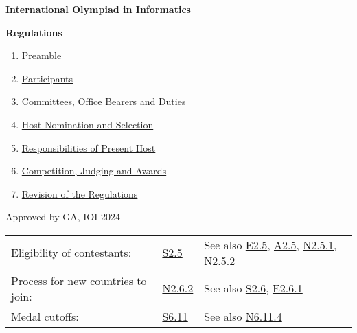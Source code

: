 \documentclass[12pt,a4paper]{article}
\begin{document}
\newcommand{\Statute}[2]{\item[\textbf{S#1}]\label{S#1} #2}
\newcommand{\Explication}[2]{\item[\textbf{E#1}]\label{E#1} #2}
\newcommand{\Appendix}[2]{\item[\textbf{A#1}]\label{A#1} #2}
\newcommand{\Note}[2]{\item[\textbf{N#1}]\label{N#1} \emph{#2}}
\newcommand{\Separator}[1]{\item[]\noindent\rule[4pt]{\linewidth}{0.4pt}}
\newcommand{\IOIn}[1][]{IOI\emph{'$n{#1}$}}
\newcommand{\Link}[1]{\hyperref[#1]{#1}}

\centerline{\huge \textbf{International Olympiad in Informatics}}
\vspace{1em}
\centerline{\huge \textbf{Regulations}}
\vspace{2em}
\begin{enumerate}
\item \hyperref[sec:1]{Preamble}
\item \hyperref[sec:2]{Participants}
\item \hyperref[sec:3]{Committees, Office Bearers and Duties}
\item \hyperref[sec:4]{Host Nomination and Selection}
\item \hyperref[sec:5]{Responsibilities of Present Host}
\item \hyperref[sec:6]{Competition, Judging and Awards}
\item \hyperref[sec:7]{Revision of the Regulations}
\end{enumerate}
\vspace{2em}
Approved by GA, IOI 2024

\vspace*{\fill}
\par
\vspace{1em}
\begin{tabular}{ l l l }
    Eligibility of contestants: & \Link{S2.5} & See also \Link{E2.5}, \Link{A2.5}, \Link{N2.5.1}, \Link{N2.5.2} \\
    Process for new countries to join: & \Link{N2.6.2} & See also \Link{S2.6}, \Link{E2.6.1} \\
    Medal cutoffs: & \Link{S6.11} & See also \Link{N6.11.4} \\
\end{tabular}

\newpage
\end{document}
